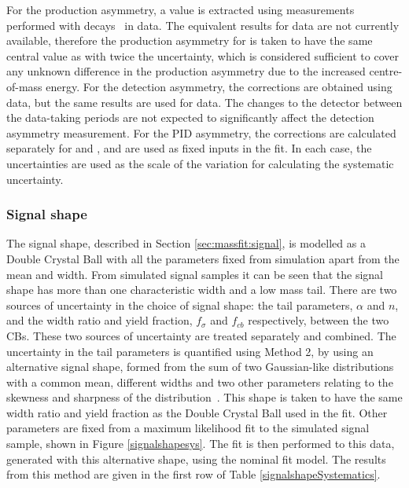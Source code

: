 For the production asymmetry, a \runone value is extracted using measurements performed with \decay{\Bp}{\Dzb\pip} decays~\cite{LHCb-PAPER-2016-054} in data. The equivalent results for \runtwo data are not currently available, therefore the production asymmetry for \runtwo is taken to have the same central value as \runone with twice the uncertainty, which is considered sufficient to cover any unknown difference in the production asymmetry due to the increased centre-of-mass energy. For the detection asymmetry, the corrections are obtained using \runone data, but the same results are used for \runtwo data. The changes to the detector between the data-taking periods are not expected to significantly affect the detection asymmetry measurement. For the PID asymmetry, the corrections are calculated separately for \runone and \runtwo, and are used as fixed inputs in the \CP fit. In each case, the uncertainties are used as the scale of the variation for calculating the systematic uncertainty.

\subsubsection{Signal shape}
\label{sec:systematics:signal}

The signal shape, described in Section \ref{sec:massfit:signal}, is modelled as a Double Crystal Ball with all the parameters fixed from simulation apart from the mean and width. From simulated signal samples it can be seen that the signal shape has more than one characteristic width and a low mass tail. There are two sources of uncertainty in the choice of signal shape: the tail parameters, $\alpha$ and $n$, and the width ratio and yield fraction, $f_{\sigma}$ and $f_{cb}$ respectively, between the two CBs. These two sources of uncertainty are treated separately and combined. The uncertainty in the tail parameters is quantified using Method 2, by using an alternative signal shape, formed from the sum of two Gaussian-like distributions with a common mean, different widths and two other parameters relating to the skewness and sharpness of the distribution~\cite{doublejohnson}. This shape is taken to have the same width ratio and yield fraction as the Double Crystal Ball used in the \CP fit. Other parameters are fixed from a maximum likelihood fit to the simulated signal sample, shown in Figure \ref{signalshapesys}. The \CP fit is then performed to this data, generated with this alternative shape, using the nominal fit model.  The results from this method are given in the first row of Table \ref{signalshapeSystematics}.

